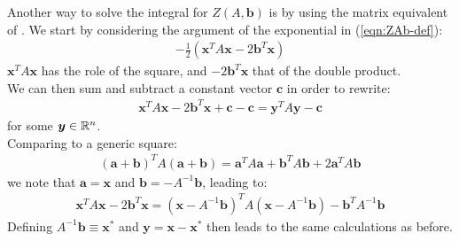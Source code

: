 \documentclass[../template.tex]{subfiles}
\begin{document}
\begin{expl}
    Another way to solve the integral for $Z(A,\bm{b})$ is by using the matrix equivalent of . We start by considering the argument of the exponential in (\ref{eqn:ZAb-def}):
    \begin{align*}
        -\frac{1}{2}(\bm{x}^T A \bm{x} -2\bm{b}^T \bm{x}) 
    \end{align*}
    $\bm{x}^T A \bm{x}$ has the role of the square, and $-2\bm{b}^T \bm{x}$ that of the double product. \\
    We can then sum and subtract a constant vector $\bm{c}$ in order to rewrite:
    \begin{align*}
        \bm{x}^T A \bm{x} - 2\bm{b}^T \bm{x} + \bm{c}-\bm{c} = \bm{y}^T A \bm{y} - \bm{c}
    \end{align*}  
    for some $\bm{y} \in \mathbb{R}^n$.\\
    Comparing to a generic square:
    \begin{align*}
        (\bm{a} + \bm{b})^TA(\bm{a} + \bm{b}) = \bm{a}^T A \bm{a} + \bm{b}^T A \bm{b} + 2\bm{a}^T A \bm{b}
    \end{align*}
    we note that $\bm{a} = \bm{x}$ and $\bm{b} = -A^{-1}\bm{b}$, leading to:
    \begin{align*}
        \bm{x}^T A \bm{x} - 2\bm{b}^T \bm{x} = (\bm{x} - A^{-1}\bm{b})^T A (\bm{x}-A^{-1}\bm{b})- \bm{b}^T A^{-1} \bm{b}
    \end{align*}  
    Defining $A^{-1}\bm{b} \equiv \bm{x^*}$ and $\bm{y} = \bm{x}-\bm{x^*}$ then leads to the same calculations as before.  
\end{expl}
\end{document}
